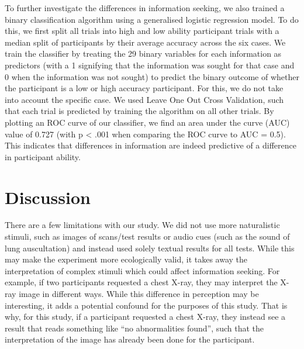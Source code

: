 \documentclass[a4paper, nobind]{templates/ociamthesis}
\begin{document}
To further investigate the differences in information seeking, we also trained a binary classification algorithm using a generalised logistic regression model. To do this, we first split all trials into high and low ability participant trials with a median split of participants by their average accuracy across the six cases. We train the classifier by treating the 29 binary variables for each information as predictors (with a 1 signifying that the information was sought for that case and 0 when the information was not sought) to predict the binary outcome of whether the participant is a low or high accuracy participant. For this, we do not take into account the specific case. We used Leave One Out Cross Validation, such that each trial is predicted by training the algorithm on all other trials. By plotting an ROC curve of our classifier, we find an area under the curve (AUC) value of 0.727 (with p \textless{} .001 when comparing the ROC curve to AUC = 0.5). This indicates that differences in information are indeed predictive of a difference in participant ability.

\section*{Discussion}\label{discussion}

There are a few limitations with our study. We did not use more naturalistic stimuli, such as images of scans/test results or audio cues (such as the sound of lung auscultation) and instead used solely textual results for all tests. While this may make the experiment more ecologically valid, it takes away the interpretation of complex stimuli which could affect information seeking. For example, if two participants requested a chest X-ray, they may interpret the X-ray image in different ways. While this difference in perception may be interesting, it adds a potential confound for the purposes of this study. That is why, for this study, if a participant requested a chest X-ray, they instead see a result that reads something like ``no abnormalities found'', such that the interpretation of the image has already been done for the participant.
\end{document}
